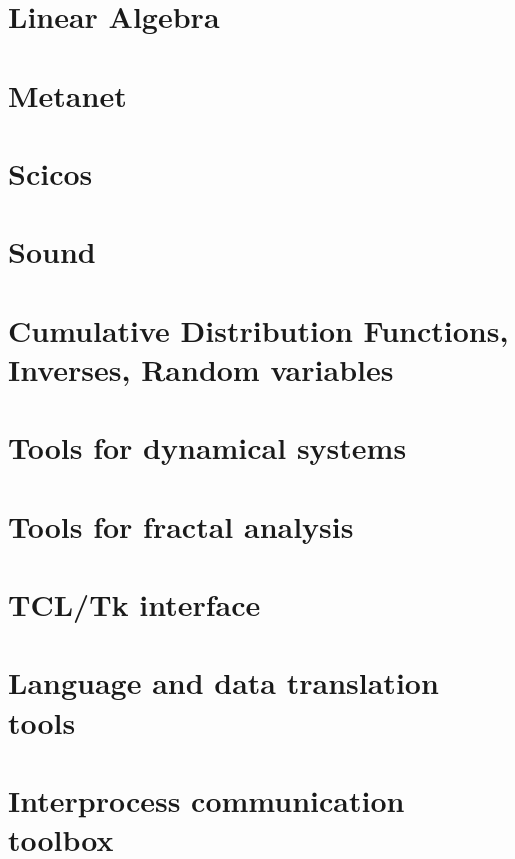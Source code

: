 \chapter{Linear Algebra}
        
\chapter{Metanet}
        
\chapter{Scicos} 
        
\chapter{Sound} 
        
\chapter{Cumulative Distribution Functions, Inverses, Random variables}
        
\chapter{Tools for dynamical systems}
        
\chapter{Tools for fractal analysis}
        
\chapter{TCL/Tk interface}
        
\chapter{Language and data translation tools}
        
\chapter{Interprocess communication toolbox}
        
\printindex

